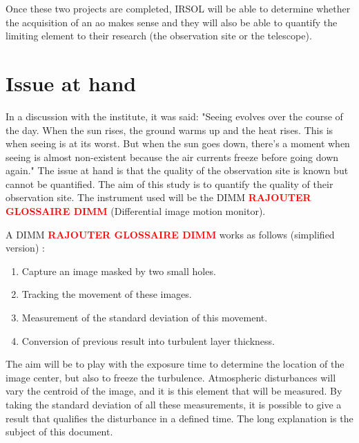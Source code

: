 Once these two projects are completed, IRSOL will be able to determine whether the acquisition of an \acrfull{ao} makes sense
and they will also be able to quantify the limiting element to their research (the observation site or the telescope).



\section{Issue at hand}
In a discussion with the institute, it was said: "Seeing evolves over the course of the day.
When the sun rises, the ground warms up and the heat rises. This is when seeing is at its worst.
But when the sun goes down, there's a moment when seeing is almost non-existent because the air currents freeze before going down again."
\bigbreak
The issue at hand is that the quality of the observation site is known but cannot be quantified.
The aim of this study is to quantify the quality of their observation site.
The instrument used will be the DIMM \textbf{\textcolor{red}{RAJOUTER GLOSSAIRE DIMM}} (Differential image motion monitor).

A DIMM \textbf{\textcolor{red}{RAJOUTER GLOSSAIRE DIMM}} works as follows (simplified version) :
\begin{enumerate}
    \item Capture an image masked by two small holes.
    \item Tracking the movement of these images.
    \item Measurement of the standard deviation of this movement.
    \item Conversion of previous result into turbulent layer thickness.
\end{enumerate}
The aim will be to play with the exposure time to determine the location of the image center, but also to freeze the turbulence.
\newline
Atmospheric disturbances will vary the centroid of the image, and it is this element that will be measured. 
By taking the standard deviation of all these measurements, it is possible to give a result that qualifies the disturbance in a defined time.
\newline
The long explanation is the subject of this document.

